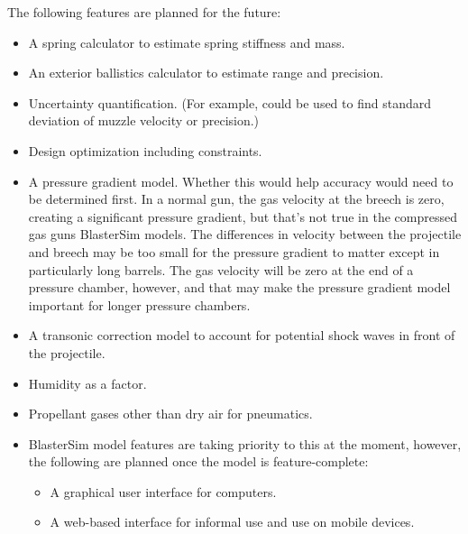 The following features are planned for the future:
\begin{itemize}
\item A spring calculator to estimate spring stiffness and mass.
\item An exterior ballistics calculator to estimate range and precision.
\item Uncertainty quantification. (For example, could be used to find standard deviation of muzzle velocity or precision.)
\item Design optimization including constraints.
\item A pressure gradient model.
Whether this would help accuracy would need to be determined first.
In a normal gun, the gas velocity at the breech is zero, creating a significant pressure gradient, but that's not true in the compressed gas guns BlasterSim models.
The differences in velocity between the projectile and breech may be too small for the pressure gradient to matter except in particularly long barrels.
The gas velocity will be zero at the end of a pressure chamber, however, and that may make the pressure gradient model important for longer pressure chambers.
\item A transonic correction model to account for potential shock waves in front of the projectile.
\item Humidity as a factor.
\item Propellant gases other than dry air for pneumatics.
\item BlasterSim model features are taking priority to this at the moment, however, the following are planned once the model is feature-complete:
\begin{itemize}
    \item A graphical user interface for computers.
    \item A web-based interface for informal use and use on mobile devices.
\end{itemize}
\end{itemize}
